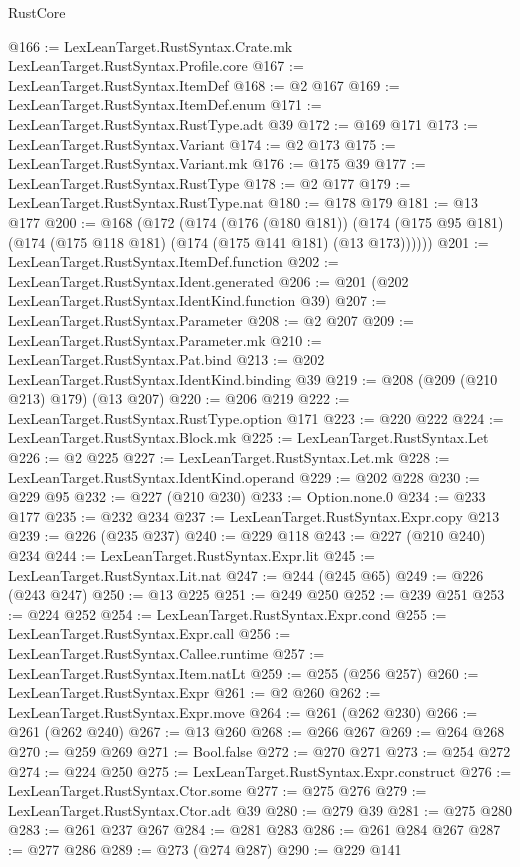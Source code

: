 \begin{lexlean}{RustCore}
\begin{coremodule}
@166 := LexLeanTarget.RustSyntax.Crate.mk LexLeanTarget.RustSyntax.Profile.core
@167 := LexLeanTarget.RustSyntax.ItemDef
@168 := @2 @167
@169 := LexLeanTarget.RustSyntax.ItemDef.enum
@171 := LexLeanTarget.RustSyntax.RustType.adt @39
@172 := @169 @171
@173 := LexLeanTarget.RustSyntax.Variant
@174 := @2 @173
@175 := LexLeanTarget.RustSyntax.Variant.mk
@176 := @175 @39
@177 := LexLeanTarget.RustSyntax.RustType
@178 := @2 @177
@179 := LexLeanTarget.RustSyntax.RustType.nat
@180 := @178 @179
@181 := @13 @177
@200 := @168
    (@172
      (@174
        (@176 (@180 @181))
        (@174 (@175 @95 @181) (@174 (@175 @118 @181) (@174 (@175 @141 @181) (@13 @173))))))
@201 := LexLeanTarget.RustSyntax.ItemDef.function
@202 := LexLeanTarget.RustSyntax.Ident.generated
@206 := @201 (@202 LexLeanTarget.RustSyntax.IdentKind.function @39)
@207 := LexLeanTarget.RustSyntax.Parameter
@208 := @2 @207
@209 := LexLeanTarget.RustSyntax.Parameter.mk
@210 := LexLeanTarget.RustSyntax.Pat.bind
@213 := @202 LexLeanTarget.RustSyntax.IdentKind.binding @39
@219 := @208 (@209 (@210 @213) @179) (@13 @207)
@220 := @206 @219
@222 := LexLeanTarget.RustSyntax.RustType.option @171
@223 := @220 @222
@224 := LexLeanTarget.RustSyntax.Block.mk
@225 := LexLeanTarget.RustSyntax.Let
@226 := @2 @225
@227 := LexLeanTarget.RustSyntax.Let.mk
@228 := LexLeanTarget.RustSyntax.IdentKind.operand
@229 := @202 @228
@230 := @229 @95
@232 := @227 (@210 @230)
@233 := Option.none.{0}
@234 := @233 @177
@235 := @232 @234
@237 := LexLeanTarget.RustSyntax.Expr.copy @213
@239 := @226 (@235 @237)
@240 := @229 @118
@243 := @227 (@210 @240) @234
@244 := LexLeanTarget.RustSyntax.Expr.lit
@245 := LexLeanTarget.RustSyntax.Lit.nat
@247 := @244 (@245 @65)
@249 := @226 (@243 @247)
@250 := @13 @225
@251 := @249 @250
@252 := @239 @251
@253 := @224 @252
@254 := LexLeanTarget.RustSyntax.Expr.cond
@255 := LexLeanTarget.RustSyntax.Expr.call
@256 := LexLeanTarget.RustSyntax.Callee.runtime
@257 := LexLeanTarget.RustSyntax.Item.natLt
@259 := @255 (@256 @257)
@260 := LexLeanTarget.RustSyntax.Expr
@261 := @2 @260
@262 := LexLeanTarget.RustSyntax.Expr.move
@264 := @261 (@262 @230)
@266 := @261 (@262 @240)
@267 := @13 @260
@268 := @266 @267
@269 := @264 @268
@270 := @259 @269
@271 := Bool.false
@272 := @270 @271
@273 := @254 @272
@274 := @224 @250
@275 := LexLeanTarget.RustSyntax.Expr.construct
@276 := LexLeanTarget.RustSyntax.Ctor.some
@277 := @275 @276
@279 := LexLeanTarget.RustSyntax.Ctor.adt @39
@280 := @279 @39
@281 := @275 @280
@283 := @261 @237 @267
@284 := @281 @283
@286 := @261 @284 @267
@287 := @277 @286
@289 := @273 (@274 @287)
@290 := @229 @141

\end{coremodule}
\end{lexlean}
